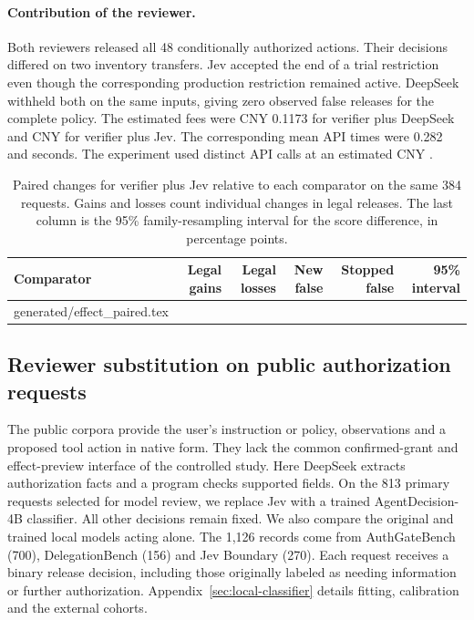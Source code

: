 \documentclass[10pt,letterpaper]{article}
\makeatletter
\newcommand{\tablerows}[1]{\@@input #1 }
\makeatother
\begin{document}
\paragraph{Contribution of the reviewer.}
Both reviewers released all 48 conditionally authorized actions. Their decisions differed on two inventory transfers. Jev accepted the end of a trial restriction even though the corresponding production restriction remained active. DeepSeek withheld both on the same inputs, giving zero observed false releases for the complete policy. The estimated fees were CNY 0.1173 for verifier plus DeepSeek and CNY \EffectJointFee{} for verifier plus Jev. The corresponding mean API times were 0.282 and \EffectJointTime{} seconds. The experiment used \EffectStudyCalls{} distinct API calls at an estimated CNY \EffectStudyCost{}.

\begin{table}[!htb]\centering\small
\caption{Paired changes for verifier plus Jev relative to each comparator on the same 384 requests. Gains and losses count individual changes in legal releases. The last column is the 95\% family-resampling interval for the score difference, in percentage points.}
\label{tab:paired}
\begin{tabular}{@{}lrrrrr@{}}\toprule
Comparator & Legal gains & Legal losses & New false & Stopped false & 95\% interval \\ \midrule
\tablerows{generated/effect_paired.tex}
\bottomrule\end{tabular}
\end{table}


\FloatBarrier
\subsection{Reviewer substitution on public authorization requests}
\label{sec:public-review}
The public corpora provide the user's instruction or policy, observations and a proposed tool action in native form. They lack the common confirmed-grant and effect-preview interface of the controlled study. Here DeepSeek extracts authorization facts and a program checks supported fields. On the 813 primary requests selected for model review, we replace Jev with a trained AgentDecision-4B classifier. All other decisions remain fixed. We also compare the original and trained local models acting alone. The 1,126 records come from AuthGateBench (700), DelegationBench (156) and Jev Boundary (270). Each request receives a binary release decision, including those originally labeled as needing information or further authorization. Appendix~\ref{sec:local-classifier} details fitting, calibration and the external cohorts.
\end{document}
